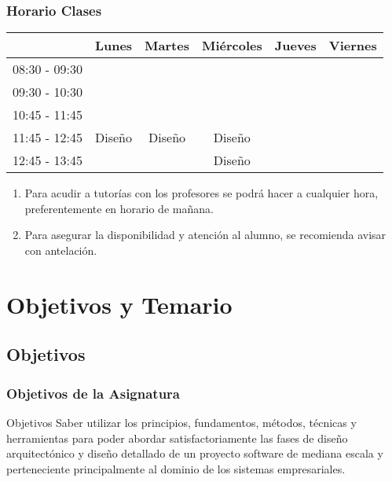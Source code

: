 \documentclass[animated,a4paper,slidestop,xcolor=pst,blue]{beamer}
\begin{document}
\begin{frame}[c]
	\frametitle{Horario Clases}
	\begin{small}
	\begin{center}
	\begin{tabular}{||l|c|c|c|c|c||}
	\hline \hline
				   & Lunes  & Martes  & Miércoles   & Jueves      & Viernes      \\ \hline \hline
    08:30 - 09:30  &        &         &             &             &              \\ \hline
	09:30 - 10:30  &        &         &             &             &              \\ \hline
	10:45 - 11:45  &        &         &             &             &              \\ \hline
	11:45 - 12:45  & Diseño & Diseño  & Diseño      &             &              \\ \hline
	12:45 - 13:45  &        &         & Diseño      &             &              \\ \hline \hline
	\end{tabular}
	\end{center}
	\end{small}
    \begin{enumerate}
        \item<2-> Para acudir a tutorías con los profesores se podrá hacer a cualquier hora, preferentemente en horario de mañana.
        \item<3-> Para asegurar la disponibilidad y atención al alumno, se recomienda avisar con antelación.
    \end{enumerate}
\end{frame}

\section{Objetivos y Temario}

\subsection{Objetivos}

\begin{frame}[c]
	\frametitle{Objetivos de la Asignatura}
	\begin{block}{Objetivos}
        Saber utilizar los principios, fundamentos, métodos, técnicas y herramientas para poder abordar satisfactoriamente las fases de \alert{diseño arquitectónico} y \alert{diseño detallado} de un proyecto software de mediana escala y perteneciente principalmente al dominio de los sistemas empresariales.
	\end{block}
\end{frame}
\end{document}
